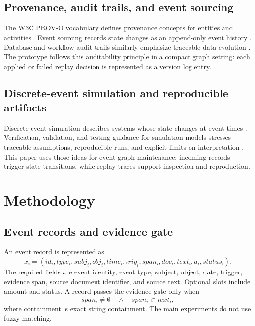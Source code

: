 \documentclass[3p,times,procedia]{elsarticle}
\begin{document}
\subsection{Provenance, audit trails, and event sourcing}

The W3C PROV-O vocabulary defines provenance concepts for entities and activities \cite{w3c2013provo}. Event sourcing records state changes as an append-only event history \cite{fowler2005eventsourcing}. Database and workflow audit trails similarly emphasize traceable data evolution \cite{buneman2001and}. The prototype follows this auditability principle in a compact graph setting: each applied or failed replay decision is represented as a version log entry.

\subsection{Discrete-event simulation and reproducible artifacts}

Discrete-event simulation describes systems whose state changes at event times \cite{banks2010discrete,law2015simulation}. Verification, validation, and testing guidance for simulation models stresses traceable assumptions, reproducible runs, and explicit limits on interpretation \cite{sargent2013verification}. This paper uses those ideas for event graph maintenance: incoming records trigger state transitions, while replay traces support inspection and reproduction.

\section{Methodology}

\subsection{Event records and evidence gate}

An event record is represented as
\begin{equation}
x_i = (id_i, type_i, subj_i, obj_i, time_i, trig_i, span_i, doc_i, text_i, a_i, status_i).
\end{equation}
The required fields are event identity, event type, subject, object, date, trigger, evidence span, source document identifier, and source text. Optional slots include amount and status. A record passes the evidence gate only when
\begin{equation}
span_i \ne \emptyset \quad \wedge \quad span_i \subset text_i,
\end{equation}
where containment is exact string containment. The main experiments do not use fuzzy matching.
\end{document}
